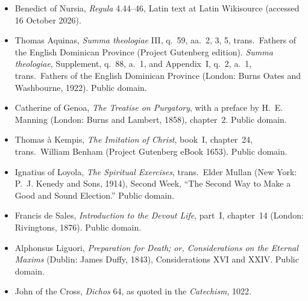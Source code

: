 {\fontsize{8.6}{9.6}\selectfont
\begin{itemize}[itemsep=0pt,parsep=0pt,topsep=0.05em]
\item Benedict of Nursia, \emph{Regula} 4.44--46, Latin text at Latin Wikisource (accessed 16 October 2026).
\item Thomas Aquinas, \emph{Summa theologiae} III, q.~59, aa.~2, 3, 5, trans.\ Fathers of the English Dominican Province (Project Gutenberg edition). \emph{Summa theologiae}, Supplement, q.~88, a.~1, and Appendix~I, q.~2, a.~1, trans.\ Fathers of the English Dominican Province (London: Burns Oates and Washbourne, 1922). Public domain.
\item Catherine of Genoa, \emph{The Treatise on Purgatory}, with a preface by H.~E. Manning (London: Burns and Lambert, 1858), chapter~2. Public domain.
\item Thomas \`a Kempis, \emph{The Imitation of Christ}, book~I, chapter~24, trans.\ William Benham (Project Gutenberg eBook 1653). Public domain.
\item Ignatius of Loyola, \emph{The Spiritual Exercises}, trans.\ Elder Mullan (New York: P.~J. Kenedy and Sons, 1914), Second Week, ``The Second Way to Make a Good and Sound Election.'' Public domain.
\item Francis de Sales, \emph{Introduction to the Devout Life}, part~I, chapter~14 (London: Rivingtons, 1876). Public domain.
\item Alphonsus Liguori, \emph{Preparation for Death; or, Considerations on the Eternal Maxims} (Dublin: James Duffy, 1843), Considerations XVI and XXIV. Public domain.
\item John of the Cross, \emph{Dichos} 64, as quoted in the \emph{Catechism}, 1022.
\end{itemize}}

\endgroup
